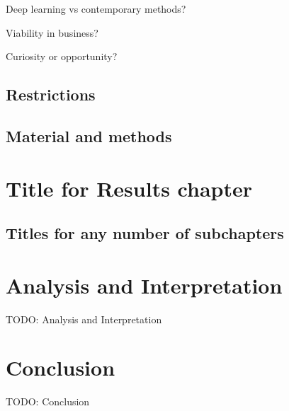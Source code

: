 Deep learning vs contemporary methods?

Viability in business?

Curiosity or opportunity?

\subsection{Restrictions}


\subsection{Material and methods}

\newpage

\section{Title for Results chapter}
\subsection{Titles for any number of subchapters}

\newpage

\section{Analysis and Interpretation}
TODO: Analysis and Interpretation

\newpage

\section{Conclusion}
TODO: Conclusion
